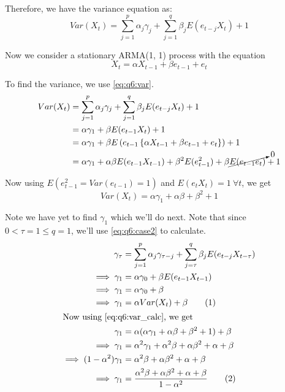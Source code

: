 \documentclass[12pt, oneside]{article}
\newcommand\numberthis{\addtocounter{equation}{1}\tag{\theequation}}
\begin{document}
\begin{enumerate}
{    Therefore, we have the variance equation as:
    \begin{equation}
        Var(X_t) = \sum_{j=1}^{p}\alpha_j \gamma_j + \sum_{j=1}^{q} \beta_j E(e_{t-j} X_t) + 1 \label{eq:q6:var}
    \end{equation}

    Now we consider a stationary ARMA(1, 1) process with the equation
    \[X_t = \alpha X_{t-1} + \beta e_{t-1} + e_t\]

    To find the variance, we use \eqref{eq:q6:var}.
    \begin{align*}
        Var(X_t) &= \sum_{j=1}^{p}\alpha_j \gamma_j + \sum_{j=1}^{q} \beta_j E(e_{t-j} X_t) + 1 \\
            &= \alpha \gamma_1 + \beta E(e_{t-1} X_t) + 1 \\
            &= \alpha \gamma_1 + \beta E\left(e_{t-1} \left\{\alpha X_{t-1} + \beta e_{t-1} + e_t\right\} \right) + 1 \\
            &= \alpha \gamma_1 + \alpha \beta E(e_{t-1} X_{t-1}) + \beta^2 E(e_{t-1}^2) + \beta \cancelto{0}{E(e_{t-1} e_t)} + 1
    \end{align*}

    Now using \(E(e_{t-1}^2 = Var(e_{t-1}) = 1)\) and \(E(e_t X_t) = 1 ~\forall t\), we get
    \begin{equation}
        Var(X_t) = \alpha \gamma_1 + \alpha \beta + \beta^2 + 1 \label{eq:q6:var_calc}
    \end{equation}

    Note we have yet to find \(\gamma_1\) which we'll do next. Note that since \(0 < \tau = 1 \leq q = 1\),
    we'll use \eqref{eq:q6:case2} to calculate.
    \begin{align*}
        \gamma_{\tau} &= \sum_{j=1}^{p}\alpha_j \gamma_{\tau - j} + \sum_{j=\tau}^{q} \beta_j E(e_{t-j} X_{t-\tau}) \\
        \implies \gamma_1 &= \alpha \gamma_0 + \beta E(e_{t-1} X_{t-1}) \\
        \implies \gamma_1 &= \alpha \gamma_0 + \beta \\
        \implies \gamma_1 &= \alpha Var(X_t) + \beta \numberthis \label{eq:q6:gamma1_var} \\
        \intertext{Now using \eqref{eq:q6:var_calc}, we get}
        \gamma_1 &= \alpha (\alpha \gamma_1 + \alpha \beta + \beta^2 + 1) + \beta \\
        \implies \gamma_1 &= \alpha^2 \gamma_1 + \alpha^2 \beta + \alpha \beta^2 + \alpha + \beta \\
        \implies (1 - \alpha^2) \gamma_1 &= \alpha^2 \beta + \alpha \beta^2 + \alpha + \beta \\
        \implies \gamma_1 &= \frac{\alpha^2 \beta + \alpha \beta^2 + \alpha + \beta}{1 - \alpha^2} 
            \numberthis \label{eq:q6:gamma1_ans}
    \end{align*}

}
\end{enumerate}
\end{document}
